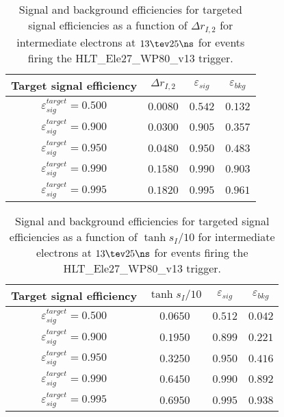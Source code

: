 \clearpage

\begin{table}[!bht]
  \begin{center}
    \begin{tabular}{cccc}
      \hline
      Target signal efficiency & $\Delta r_{I,2}$ & $\varepsilon_{sig}$ & $\varepsilon_{bkg}$ \\ 
      \hline
      $\varepsilon_{sig}^{target} = 0.500$ & $  0.0080$ & $0.542$ & $0.132$ \\
      $\varepsilon_{sig}^{target} = 0.900$ & $  0.0300$ & $0.905$ & $0.357$ \\
      $\varepsilon_{sig}^{target} = 0.950$ & $  0.0480$ & $0.950$ & $0.483$ \\
      $\varepsilon_{sig}^{target} = 0.990$ & $  0.1580$ & $0.990$ & $0.903$ \\
      $\varepsilon_{sig}^{target} = 0.995$ & $  0.1820$ & $0.995$ & $0.961$ \\
      \hline
    \end{tabular}
    \caption{Signal and background efficiencies for targeted signal efficiencies as a function of $\Delta r_{I,2}$ for intermediate electrons at $13\tev 25\ns$ for events firing the HLT\_Ele27\_WP80\_v13 trigger.}
    \label{tab:eff_rej_r2I_beam_13_25_trigger_27_I}
  \end{center}
\end{table}

\clearpage

\begin{table}[!bht]
  \begin{center}
    \begin{tabular}{cccc}
      \hline
      Target signal efficiency & $\tanh{s_I/10}$ & $\varepsilon_{sig}$ & $\varepsilon_{bkg}$ \\ 
      \hline
      $\varepsilon_{sig}^{target} = 0.500$ & $  0.0650$ & $0.512$ & $0.042$ \\
      $\varepsilon_{sig}^{target} = 0.900$ & $  0.1950$ & $0.899$ & $0.221$ \\
      $\varepsilon_{sig}^{target} = 0.950$ & $  0.3250$ & $0.950$ & $0.416$ \\
      $\varepsilon_{sig}^{target} = 0.990$ & $  0.6450$ & $0.990$ & $0.892$ \\
      $\varepsilon_{sig}^{target} = 0.995$ & $  0.6950$ & $0.995$ & $0.938$ \\
      \hline
    \end{tabular}
    \caption{Signal and background efficiencies for targeted signal efficiencies as a function of $\tanh{s_I/10}$ for intermediate electrons at $13\tev 25\ns$ for events firing the HLT\_Ele27\_WP80\_v13 trigger.}
    \label{tab:eff_rej_sI_beam_13_25_trigger_27_I}
  \end{center}
\end{table}

